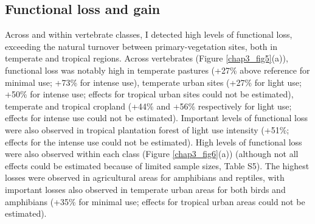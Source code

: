 \subsection{Functional loss and gain}

Across and within vertebrate classes, I detected high levels of functional loss, exceeding the natural turnover between primary-vegetation sites, both in temperate and tropical regions. Across vertebrates (Figure \ref{chap3_fig5}(a)), functional loss was notably high in temperate pastures (+27\% above reference for minimal use; +73\% for intense use), temperate urban sites (+27\% for light use; +50\% for intense use; effects for tropical urban sites could not be estimated), temperate and tropical cropland (+44\% and +56\% respectively for light use; effects for intense use could not be estimated). Important levels of functional loss were also observed in tropical plantation forest of light use intensity (+51\%; effects for the intense use could not be estimated). High levels of functional loss were also observed within each class (Figure \ref{chap3_fig6}(a)) (although not all effects could be estimated because of limited sample sizes, Table S5). The highest losses were observed in agricultural areas for amphibians and reptiles, with important losses also observed in temperate urban areas for both birds and amphibians (+35\% for minimal use; effects for tropical urban areas could not be estimated).

